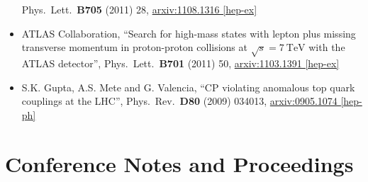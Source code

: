 \documentclass[a4paper,10pt]{article}
\begin{document}
\begin{itemize}
	Phys.\ Lett.\ {\bf B705} (2011) 28, 
	\href{http://arxiv.org/abs/arXiv:1108.1316}{arxiv:1108.1316 [hep-ex]}
	\item ATLAS Collaboration,
	``Search for high-mass states with lepton plus missing transverse momentum in proton-proton collisions at $\sqrt{s} = 7\ \mathrm{TeV}$ with the ATLAS detector'', 
	Phys.\ Lett.\ {\bf B701} (2011) 50, 
	\href{http://arxiv.org/abs/1103.1391}{arxiv:1103.1391 [hep-ex]}
	\item S.K. Gupta, A.S. Mete and G. Valencia,
	``CP violating anomalous top quark couplings at the LHC'',  
	Phys.\ Rev.\ {\bf D80} (2009) 034013, 
	\href{http://arxiv.org/abs/0905.1074}{arxiv:0905.1074 [hep-ph]}
\end{itemize}


\vspace{3mm}
\section{Conference Notes and Proceedings}
\end{document}

